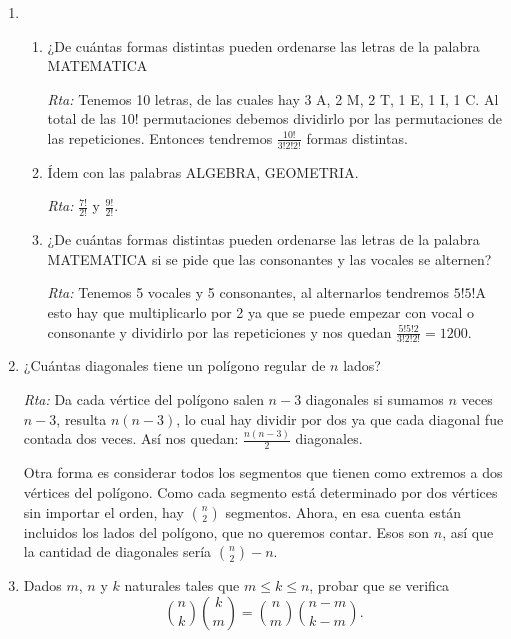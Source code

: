 \documentclass[a4paper,12pt,twoside,spanish,reqno]{amsbook}
\numberwithin{equation}{section}
\begin{document}
\begin{enumerate}
\begin{enumerate}
\end{enumerate}

\medskip

\item 
\begin{enumerate}
\item 
 ¿De cuántas formas distintas pueden ordenarse las letras de la palabra MATEMATICA

\noindent\textit{Rta:} Tenemos 10 letras, de las cuales hay 3 A, 2 M, 2 T, 1 E, 1 I, 1 C. Al total de las $10!$ permutaciones debemos dividirlo por las permutaciones de las repeticiones. Entonces tendremos $\frac{10!}{3!2!2!}$ formas distintas.

\item Ídem con las palabras ALGEBRA, GEOMETRIA.

\noindent\textit{Rta:}  $\frac{7!}{2!}$ y $\frac{9!}{2!}$.

\item ¿De cuántas formas distintas pueden ordenarse las letras de la palabra MATEMATICA
si se pide que las consonantes y las vocales se alternen?

\noindent\textit{Rta:} Tenemos 5 vocales y 5 consonantes, al alternarlos tendremos $5!5!$A esto hay que multiplicarlo por 2 ya que se puede empezar con vocal o consonante y dividirlo por las repeticiones y nos quedan $\frac{5!5!2}{3!2!2!}=1200$.
\end{enumerate}

\medskip

\item ¿Cuántas diagonales tiene un polígono regular de $n$ lados?

\noindent\textit{Rta:} Da cada vértice del polígono salen $n-3$ diagonales si sumamos $n$ veces $n-3$, resulta $n(n-3)$,  lo cual hay dividir por dos ya que cada diagonal fue contada dos veces. Así nos quedan: $ \frac{n(n-3)}{2}$ diagonales.

Otra forma es considerar todos los segmentos que tienen como extremos a dos vértices del polígono. Como cada segmento está determinado por dos vértices sin importar el orden, hay $\binom{n}{2}$ segmentos. Ahora, en esa cuenta están incluidos los lados del polígono, que no queremos contar. Esos son $n$, así que la cantidad de diagonales sería $\binom{n}{2}-n$.

\medskip

\item Dados $m$, $n$ y $k$ naturales tales que $m \le k \le n$, probar que se verifica
\begin{equation*}
\binom{n}{k}\binom{k}{m} = \binom{n}{m}\binom{n-m}{k-m}.
\end{equation*}


\end{enumerate}
\end{document}
